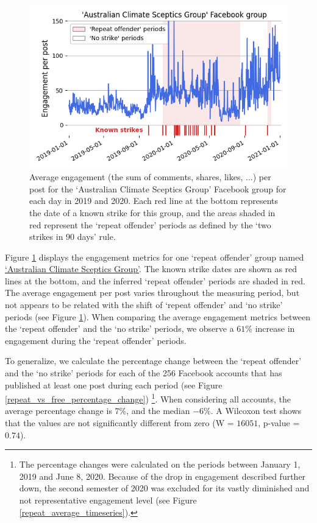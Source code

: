 \documentclass[11pt,a4paper]{article}
\begin{document}
\begin{figure}[!h]
\centering
\includegraphics[width=\linewidth]{./../figure/repeat_example_timeseries.png}
\caption{Average engagement (the sum of comments, shares, likes, ...) per post for the `Australian Climate Sceptics Group' Facebook group for each day in 2019 and 2020. Each red line at the bottom represents the date of a known strike for this group, and the areas shaded in red represent the `repeat offender' periods as defined by the ‘two strikes in 90 days’ rule.}
\label{repeat_example_timeseries}
\end{figure}

Figure \ref{repeat_example_timeseries} displays the engagement metrics for one `repeat offender' group named \href{https://www.facebook.com/groups/108655705888371/}{`Australian Climate Sceptics Group'}. 
The known strike dates are shown as red lines at the bottom, and the inferred ‘repeat offender’ periods are shaded in red. 
The average engagement per post varies throughout the measuring period, but not appears to be related with the shift of `repeat offender' and `no strike' periods (see Figure \ref{repeat_example_timeseries}).
When comparing the average engagement metrics between the `repeat offender' and the `no strike' periods, we observe a $61\%$ increase in engagement during the `repeat offender' periods.

To generalize, we calculate the percentage change between the `repeat offender' and the `no strike' periods for each of the 256 Facebook accounts that has published at least one post during each period (see Figure \ref{repeat_vs_free_percentage_change})
\footnote{The percentage changes were calculated on the periods between January 1, 2019 and June 8, 2020. Because of the drop in engagement described further down, the second semester of 2020 was excluded for its vastly diminished and not representative engagement level (see Figure \ref{repeat_average_timeseries}).}.
When considering all accounts, the average percentage change is $7\%$, and the median $-6\%$. 
A Wilcoxon test shows that the values are not significantly different from zero (W = $16051$, p-value = $0.74$).
\end{document}
